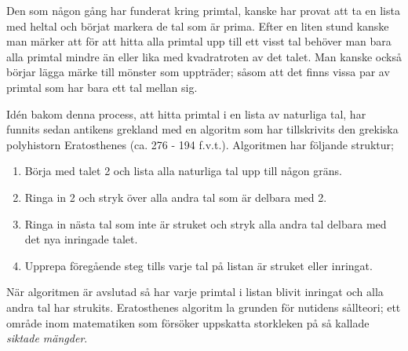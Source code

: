 \begin{comment}
Det är dessa nya matematiska sålltekniker och deras tillämpningar på blandade problem samt numerisk implementering som vår rapport kommer att fokusera på. Vi kommer att hålla oss till att redovisa hur tre olika sållmetoder, nämligen Eratosthenes allmänna såll, Bruns såll, och Selbergs såll, kan tillämpas på XXX och YYY, samt kommer vi redovisa hur man kan implementera i kod ZZZs såll. Vi kommer dessutom att diskutera möjliga förbättringar av både av dessa undersökningar vi har gjort. Men innan vi kan börja med att redovisa vårt arbete kommer vi först att nämna några förkunskaper som en läsare borde ha, sedan kommer vi introducera några grundläggande begrepp och teori inom sållteori, och slutligen kommer vi att introducera mer fullständigt de såll vi har valt att jobba med.
\end{comment}

Den som någon gång har funderat kring primtal, kanske har provat att ta en lista med heltal och börjat markera de tal som är prima. Efter en liten stund kanske man märker att för att hitta alla primtal upp till ett visst tal behöver man bara alla primtal mindre än eller lika med kvadratroten av det talet. Man kanske också börjar lägga märke till mönster som uppträder; såsom att det finns vissa par av primtal som har bara ett tal mellan sig. 

Idén bakom denna process, att hitta primtal i en lista av naturliga tal, har funnits sedan antikens grekland med en algoritm som har tillskrivits den grekiska polyhistorn Eratosthenes (ca. 276 - 194 f.v.t.). Algoritmen har följande struktur;
\begin{enumerate}
    \item Börja med talet 2 och lista alla naturliga tal upp till någon gräns.
    \item Ringa in 2 och stryk över alla andra tal som är delbara med 2.
    \item Ringa in nästa tal som inte är struket och stryk alla andra tal delbara med det nya inringade talet.
    \item Upprepa föregående steg tills varje tal på listan är struket eller inringat. 
\end{enumerate}
När algoritmen är avslutad så har varje primtal i listan blivit inringat och alla andra tal har strukits. Eratosthenes algoritm la grunden för nutidens sållteori; ett område inom matematiken som försöker uppskatta storkleken på så kallade \textit{siktade mängder}. 

